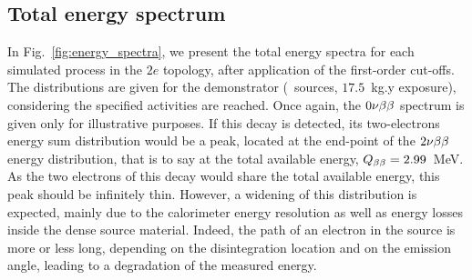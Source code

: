 \subsection{Total energy spectrum}

In Fig.~\ref{fig:energy_spectra}, we present the total energy spectra for each simulated process in the $2e$ topology, after application of the first-order cut-offs.
The distributions are given for the demonstrator (\Se\ sources, $17.5$~kg.y exposure), considering the specified activities are reached.
Once again, the $0\nu\beta\beta$ spectrum is given only for illustrative purposes.
If this decay is detected, its two-electrons energy sum distribution would be a peak, located at the end-point of the $2\nu\beta\beta$ energy distribution, that is to say at the total available energy, $Q_{\beta\beta} = 2.99$~MeV.
As the two electrons of this decay would share the total available energy, this peak should be infinitely thin.
However, a widening of this distribution is expected, mainly due to the calorimeter energy resolution as well as energy losses inside the dense source material.
Indeed, the path of an electron in the source is more or less long, depending on the disintegration location and on the emission angle, leading to a degradation of the measured energy.
